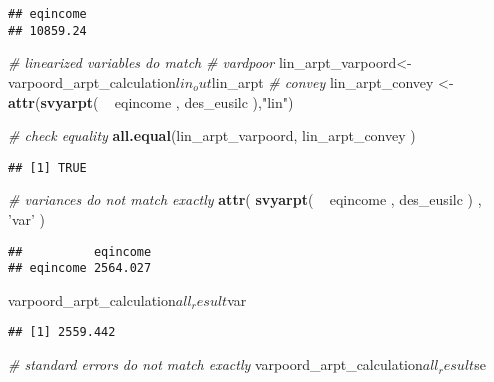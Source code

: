 \documentclass[]{book}
\newenvironment{Shaded}{\begin{snugshade}}{\end{snugshade}}
\newcommand{\KeywordTok}[1]{\textcolor[rgb]{0.13,0.29,0.53}{\textbf{{#1}}}}
\newcommand{\StringTok}[1]{\textcolor[rgb]{0.31,0.60,0.02}{{#1}}}
\newcommand{\CommentTok}[1]{\textcolor[rgb]{0.56,0.35,0.01}{\textit{{#1}}}}
\newcommand{\NormalTok}[1]{{#1}}
\begin{document}
\begin{verbatim}
## eqincome 
## 10859.24
\end{verbatim}

\begin{Shaded}
\begin{Highlighting}[]
\CommentTok{# linearized variables do match}
\CommentTok{# vardpoor}
\NormalTok{lin_arpt_varpoord<-}\StringTok{ }\NormalTok{varpoord_arpt_calculation$lin_out$lin_arpt}
\CommentTok{# convey }
\NormalTok{lin_arpt_convey <-}\StringTok{ }\KeywordTok{attr}\NormalTok{(}\KeywordTok{svyarpt}\NormalTok{( ~}\StringTok{ }\NormalTok{eqincome , des_eusilc ),}\StringTok{"lin"}\NormalTok{)}

\CommentTok{# check equality}
\KeywordTok{all.equal}\NormalTok{(lin_arpt_varpoord, lin_arpt_convey )}
\end{Highlighting}
\end{Shaded}

\begin{verbatim}
## [1] TRUE
\end{verbatim}

\begin{Shaded}
\begin{Highlighting}[]
\CommentTok{# variances do not match exactly}
\KeywordTok{attr}\NormalTok{( }\KeywordTok{svyarpt}\NormalTok{( ~}\StringTok{ }\NormalTok{eqincome , des_eusilc ) , }\StringTok{'var'} \NormalTok{)}
\end{Highlighting}
\end{Shaded}

\begin{verbatim}
##          eqincome
## eqincome 2564.027
\end{verbatim}

\begin{Shaded}
\begin{Highlighting}[]
\NormalTok{varpoord_arpt_calculation$all_result$var}
\end{Highlighting}
\end{Shaded}

\begin{verbatim}
## [1] 2559.442
\end{verbatim}

\begin{Shaded}
\begin{Highlighting}[]
\CommentTok{# standard errors do not match exactly}
\NormalTok{varpoord_arpt_calculation$all_result$se}
\end{Highlighting}
\end{Shaded}
\end{document}
